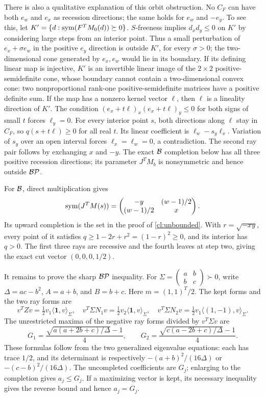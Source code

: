 There is also a qualitative explanation of this orbit obstruction.
No $C_F$ can have both $e_w$ and $e_x$ as recession directions; the same
holds for $e_w$ and $-e_y$. To see this, let
$K'=\{d:\operatorname{sym}(F^TM_0(d))\succeq0\}$.
$S$-freeness implies $d_xd_y\le0$ on $K'$ by considering large steps
from an interior point. Thus a small perturbation of $e_x+\sigma e_w$
in the positive $e_y$ direction is outside $K'$, for every $\sigma>0$;
the two-dimensional cone generated by $e_x,e_w$ would lie in its
boundary. If its defining linear map is injective, $K'$ is an invertible
linear image of the $2\times2$ positive-semidefinite cone, whose boundary
cannot contain a two-dimensional convex cone: two nonproportional
rank-one positive-semidefinite matrices have a positive definite sum.
If the map has a nonzero kernel vector $\ell$, then $\ell$ is a
lineality direction of $K'$. The condition
$(e_x+t\ell)_x(e_x+t\ell)_y\le0$ for both signs of small $t$ forces
$\ell_y=0$. For every interior point $s$, both directions along $\ell$
stay in $C_F$, so $q(s+t\ell)\ge0$ for all real $t$.
Its linear coefficient is $\ell_w-s_y\ell_x$.
Variation of $s_y$ over an open interval forces $\ell_x=\ell_w=0$,
a contradiction. The second ray pair follows by exchanging $x$ and $-y$.
The exact $\mathcal B$ completion below has all three positive recession
directions; its parameter $J^TM_b$ is nonsymmetric and hence outside
$\mathcal {BP}$.

For $\mathcal B$, direct multiplication gives
\[
 \operatorname{sym}(J^TM(s))=
 \begin{pmatrix}-y&(w-1)/2\\(w-1)/2&x\end{pmatrix}.
\]
Its upward completion is the set in the proof of
\cref{cl:unbounded}. With $r=\sqrt{-xy}$, every point of it satisfies
$q\ge1-2r+r^2=(1-r)^2\ge0$, and its interior has $q>0$.
The first three rays are recessive and the fourth leaves at step two,
giving the exact cut vector $(0,0,0,1/2)$.

It remains to prove the sharp $\mathcal {BP}$ inequality. For
$\Sigma=\left(\begin{smallmatrix}a&b\\b&c\end{smallmatrix}\right)\succ0$,
write $\Delta=ac-b^2$, $A=a+b$, and $B=b+c$.
Here $m=(1,1)^T/2$. The kept forms and the two ray forms are
\[
 v^TZv=\tfrac12v_1\langle\mathbf1,v\rangle_\Sigma,\quad
 v^T\Sigma N_1v=\tfrac12v_2\langle\mathbf1,v\rangle_\Sigma,\quad
 v^T\Sigma N_2v=\tfrac12v_1\langle(1,-1),v\rangle_\Sigma.
\]
The unrestricted maxima of the negative ray forms divided by
$v^T\Sigma v$ are
\begin{equation}\label{cl:w-G}
 G_1=\frac{\sqrt{a(a+2b+c)/\Delta}-1}{4},\qquad
 G_2=\frac{\sqrt{c(a-2b+c)/\Delta}-1}{4}.
\end{equation}
These formulas follow from the two generalized eigenvalue equations:
each has trace $1/2$, and its determinant is respectively
$-(a+b)^2/(16\Delta)$ or $-(c-b)^2/(16\Delta)$.
The uncompleted coefficients are $G_j$; enlarging to the completion
gives $a_j\le G_j$. If a maximizing vector is kept, its necessary
inequality gives the reverse bound and hence $a_j=G_j$.

